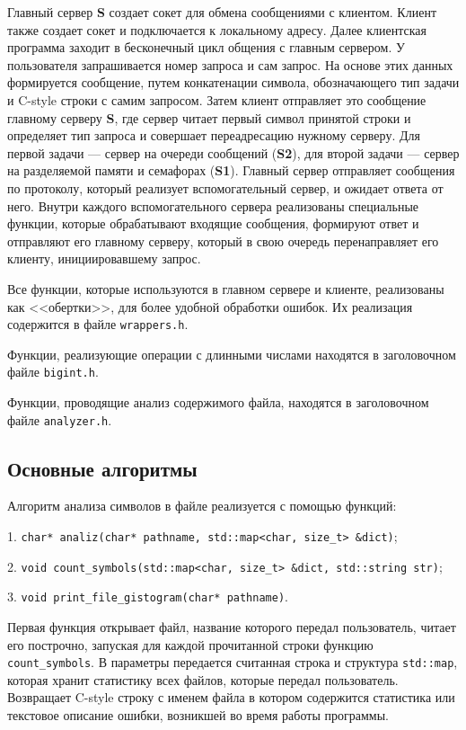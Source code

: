 \documentclass[a4paper,14pt]{extarticle}
\begin{document}
Главный сервер \textbf{S} создает сокет для обмена сообщениями с клиентом. Клиент также создает сокет и подключается к локальному адресу. 
Далее клиентская программа заходит в бесконечный цикл общения с главным сервером. У пользователя запрашивается номер запроса и сам запрос. На основе этих данных формируется сообщение, путем конкатенации символа, обозначающего тип задачи и C-style строки с самим запросом. Затем клиент отправляет это сообщение главному серверу \textbf{S}, где сервер читает первый символ принятой строки и определяет тип запроса и совершает переадресацию нужному серверу. Для первой задачи --- сервер на очереди сообщений (\textbf{S2}), для второй задачи --- сервер на разделяемой памяти и семафорах (\textbf{S1}). Главный сервер отправляет сообщения по протоколу, который реализует вспомогательный сервер, и ожидает ответа от него. Внутри каждого вспомогательного сервера реализованы специальные функции, которые обрабатывают входящие сообщения, формируют ответ и отправляют его главному серверу, который в свою очередь перенаправляет его клиенту, инициировавшему запрос.

Все функции, которые используются в главном сервере и клиенте, реализованы как <<обертки>>, для более удобной обработки ошибок. Их реализация содержится в файле \verb|wrappers.h|.

Функции, реализующие операции с длинными числами находятся в заголовочном файле \verb|bigint.h|.

Функции, проводящие анализ содержимого файла, находятся в заголовочном файле \verb|analyzer.h|.

\subsection{Основные алгоритмы}
Алгоритм анализа символов в файле реализуется с помощью функций:

1. \verb|char* analiz(char* pathname, std::map<char, size_t> &dict)|;

2. \verb|void count_symbols(std::map<char, size_t> &dict, std::string str)|;

3. \verb|void print_file_gistogram(char* pathname)|.

Первая функция открывает файл, название которого передал пользователь, читает его построчно, запуская для каждой прочитанной строки функцию \verb|count_symbols|. В параметры передается считанная строка и структура \verb|std::map|, которая хранит статистику всех файлов, которые передал пользователь. Возвращает C-style строку с именем файла в котором содержится статистика или текстовое описание ошибки, возникшей во время работы программы.
\end{document}
